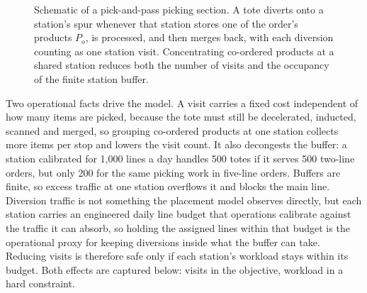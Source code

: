 \documentclass[]{interact}
\begin{document}
\begin{figure}[H]
\centering
{}
\caption{Schematic of a pick-and-pass picking section. A tote diverts onto a station's spur whenever that station stores one of the order's products $P_o$, is processed, and then merges back, with each diversion counting as one station visit. Concentrating co-ordered products at a shared station reduces both the number of visits and the occupancy of the finite station buffer.}
\label{fig:schematic}
\end{figure}

Two operational facts drive the model. A visit carries a fixed cost independent of how many items are picked, because the tote must still be decelerated, inducted, scanned and merged, so grouping co-ordered products at one station collects more items per stop and lowers the visit count. It also decongests the buffer: a station calibrated for 1,000 lines a day handles 500 totes if it serves 500 two-line orders, but only 200 for the same picking work in five-line orders. Buffers are finite, so excess traffic at one station overflows it and blocks the main line. Diversion traffic is not something the placement model observes directly, but each station carries an engineered daily line budget that operations calibrate against the traffic it can absorb, so holding the assigned lines within that budget is the operational proxy for keeping diversions inside what the buffer can take. Reducing visits is therefore safe only if each station's workload stays within its budget. Both effects are captured below: visits in the objective, workload in a hard constraint.
\end{document}
